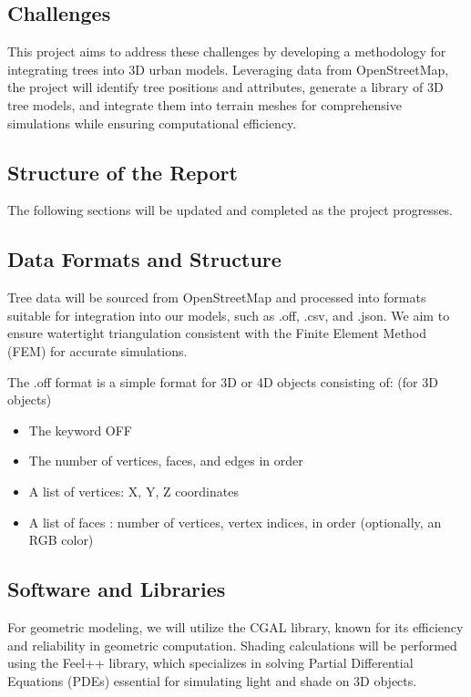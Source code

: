 \documentclass[12pt]{article}
\begin{document}
\subsection{Challenges}
This project aims to address these challenges by developing a methodology for 
integrating trees into 3D urban models. Leveraging data from OpenStreetMap, the 
project will identify tree positions and attributes, generate a library of 3D tree 
models, and integrate them into terrain meshes for comprehensive simulations while
ensuring computational efficiency.

\subsection{Structure of the Report}
The following sections will be updated and completed as the project progresses.

\subsection{Data Formats and Structure}
Tree data will be sourced from OpenStreetMap and processed into formats suitable for 
integration into our models, such as .off, .csv, and .json. We aim to ensure watertight 
triangulation consistent with the Finite Element Method (FEM) for accurate simulations.  

The .off format\cite{off_format} is a simple format for 3D or 4D objects consisting of: (for 3D objects)
\begin{itemize}
    \item The keyword OFF
    \item The number of vertices, faces, and edges in order 
    \item A list of vertices: X, Y, Z coordinates
    \item A list of faces : number of vertices, vertex indices, in order (optionally, an RGB color)
\end{itemize}

\subsection{Software and Libraries}
For geometric modeling, we will utilize the CGAL \cite{cgal} library, known for its efficiency and 
reliability in geometric computation. Shading calculations will be performed using the 
Feel++ \cite{feel++} library, which specializes in solving Partial Differential Equations (PDEs) 
essential for simulating light and shade on 3D objects.
\end{document}

